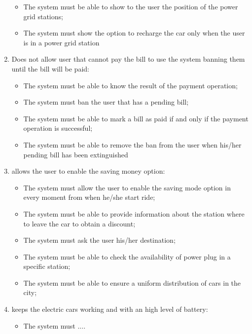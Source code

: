 \begin{enumerate}
\begin{itemize}
\item The system must be able to show to the user the position of the  power grid stations;
\item The system must show the option to recharge the car only when the user is in a power grid station
\end{itemize}

\item Does not allow user that cannot pay the bill to use the system banning them until the bill will be paid:
\begin{itemize}
\item The system must be able to know the result of the payment operation;
\item The system must ban the user that has a pending bill;
\item The system must be able to mark a bill as paid if and only if the payment operation is successful;
\item The system must be able to remove the ban from the user when his/her pending bill has been extinguished
\end{itemize}

\item allows the user to enable the saving money option:

\begin{itemize}
\item The system must allow the user to enable the saving mode option in every moment from when he/she start ride;
\item The system must be able to provide information about the station where to leave the car to obtain a discount;
\item The system must ask the user his/her destination;
\item The system must be able to check the availability of power plug in a specific station;
\item The system must be able to ensure a uniform distribution of cars in the city;
\end{itemize}

\item keeps the electric cars working and with an high level of battery:
\begin{itemize}
\item The system must .... %
\end{itemize}


\end{enumerate}
